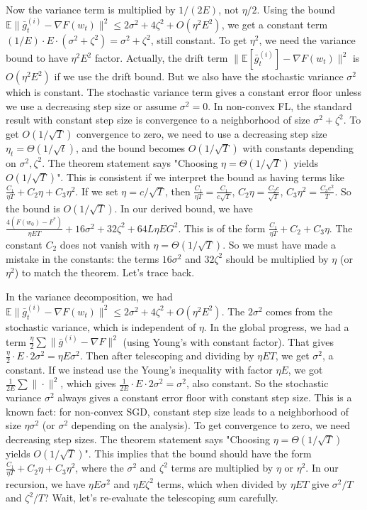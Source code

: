 \documentclass{article}
\begin{document}
Now the variance term is multiplied by $1/(2E)$, not $\eta/2$. Using the bound $\mathbb{E} \| \bar{g}_t^{(i)} - \nabla F(w_t) \|^2 \leq 2\sigma^2 + 4\zeta^2 + O(\eta^2 E^2)$, we get a constant term $(1/E) \cdot E \cdot (\sigma^2 + \zeta^2) = \sigma^2 + \zeta^2$, still constant. To get $\eta^2$, we need the variance bound to have $\eta^2 E^2$ factor. Actually, the drift term $\| \mathbb{E}[\bar{g}_t^{(i)}] - \nabla F(w_t) \|^2$ is $O(\eta^2 E^2)$ if we use the drift bound. But we also have the stochastic variance $\sigma^2$ which is constant. The stochastic variance term gives a constant error floor unless we use a decreasing step size or assume $\sigma^2=0$. In non-convex FL, the standard result with constant step size is convergence to a neighborhood of size $\sigma^2 + \zeta^2$. To get $O(1/\sqrt{T})$ convergence to zero, we need to use a decreasing step size $\eta_t = \Theta(1/\sqrt{t})$, and the bound becomes $O(1/\sqrt{T})$ with constants depending on $\sigma^2, \zeta^2$. The theorem statement says "Choosing $\eta = \Theta(1/\sqrt{T})$ yields $O(1/\sqrt{T})$". This is consistent if we interpret the bound as having terms like $\frac{C_1}{\eta T} + C_2 \eta + C_3 \eta^2$. If we set $\eta = c/\sqrt{T}$, then $\frac{C_1}{\eta T} = \frac{C_1}{c\sqrt{T}}$, $C_2 \eta = \frac{C_2 c}{\sqrt{T}}$, $C_3 \eta^2 = \frac{C_3 c^2}{T}$. So the bound is $O(1/\sqrt{T})$. In our derived bound, we have $\frac{4(F(w_0)-F^*)}{\eta E T} + 16\sigma^2 + 32\zeta^2 + 64 L \eta E G^2$. This is of the form $\frac{C_1}{\eta T} + C_2 + C_3 \eta$. The constant $C_2$ does not vanish with $\eta = \Theta(1/\sqrt{T})$. So we must have made a mistake in the constants: the terms $16\sigma^2$ and $32\zeta^2$ should be multiplied by $\eta$ (or $\eta^2$) to match the theorem. Let's trace back.

In the variance decomposition, we had $\mathbb{E} \| \bar{g}_t^{(i)} - \nabla F(w_t) \|^2 \leq 2\sigma^2 + 4\zeta^2 + O(\eta^2 E^2)$. The $2\sigma^2$ comes from the stochastic variance, which is independent of $\eta$. In the global progress, we had a term $\frac{\eta}{2} \sum \| \bar{g}^{(i)} - \nabla F \|^2$ (using Young's with constant factor). That gives $\frac{\eta}{2} \cdot E \cdot 2\sigma^2 = \eta E \sigma^2$. Then after telescoping and dividing by $\eta E T$, we get $\sigma^2$, a constant. If we instead use the Young's inequality with factor $\eta E$, we got $\frac{1}{2E} \sum \| \cdot \|^2$, which gives $\frac{1}{2E} \cdot E \cdot 2\sigma^2 = \sigma^2$, also constant. So the stochastic variance $\sigma^2$ always gives a constant error floor with constant step size. This is a known fact: for non-convex SGD, constant step size leads to a neighborhood of size $\eta \sigma^2$ (or $\sigma^2$ depending on the analysis). To get convergence to zero, we need decreasing step sizes. The theorem statement says "Choosing $\eta = \Theta(1/\sqrt{T})$ yields $O(1/\sqrt{T})$". This implies that the bound should have the form $\frac{C_1}{\eta T} + C_2 \eta + C_3 \eta^2$, where the $\sigma^2$ and $\zeta^2$ terms are multiplied by $\eta$ or $\eta^2$. In our recursion, we have $\eta E \sigma^2$ and $\eta E \zeta^2$ terms, which when divided by $\eta E T$ give $\sigma^2/T$ and $\zeta^2/T$? Wait, let's re-evaluate the telescoping sum carefully.
\end{document}
